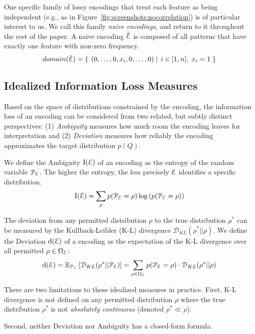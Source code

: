 
One specific family of lossy encodings that treat each feature as being independent (e.g., as in Figure~\ref{fig:screenshots:nocorrelation}) is of particular interest to us.  
We call this family \emph{naive encodings}, and return to it throughout the rest of the paper.
A naive encoding $\ddot{\mathcal E}$ is composed of all patterns that have exactly one feature with non-zero frequency.
$$domain(\ddot{\mathcal E})=\left\{\left.\;{(0, \ldots, 0, x_i, 0, \ldots, 0)}\;\right|\;{i \in [1,n],\; x_i = 1}\;\right\}$$ 


\subsection{Idealized Information Loss Measures}
\label{sec:idealizedrepresentativenessmeasures}
Based on the space of distributions constrained by the encoding, the information loss of an encoding can be considered from two related, but subtly distinct perspectives:
(1) \emph{Ambiguity} measures how much room the encoding leaves for interpretation and 
(2) \emph{Deviation} measures how reliably the encoding approximates the target distribution $p(Q)$.

\smallskip
{}
We define the Ambiguity $\text{I}(\mathcal E)$ of an encoding as the entropy of the random variable $\mathcal P_\mathcal E$. 
The higher the entropy, the less precisely $\mathcal E$ identifies a specific distribution.%
$$\text{I}(\mathcal E) = \operatorname*{\sum}\limits_{\rho}p(\mathcal P_\mathcal E = \rho)\log \left(p(\mathcal P_\mathcal E=\rho)\right)$$

The deviation from any permitted distribution $\rho$ to the true distribution $\rho^*$ can be measured by the Kullback-Leibler (K-L) divergence $\mathcal{D}_{KL}(\rho^*||\rho)$.
We define the Deviation $\text{d}(\mathcal E)$ of a encoding as the expectation of the K-L divergence over all permitted $\rho \in \Omega_\mathcal E$:
$$\text{d}(\mathcal E)=\mathbb{E}_{\mathcal{P}_\mathcal E}\left[\mathcal{D}_{KL}(\rho^*||\mathcal{P}_\mathcal E)\right] = \sum_{\rho \in \Omega_\mathcal E} p(\mathcal P_\mathcal E = \rho) \cdot \mathcal{D}_{KL}(\rho^*||\rho)$$

There are two limitations to these idealized measures in practice.
First, K-L divergence is not defined on any permitted distribution $\rho$ where the true distribution $\rho^*$ is not \emph{absolutely continuous} (denoted $\rho^*\ll\rho$). 

Second, neither Deviation nor Ambiguity has a closed-form formula. 

